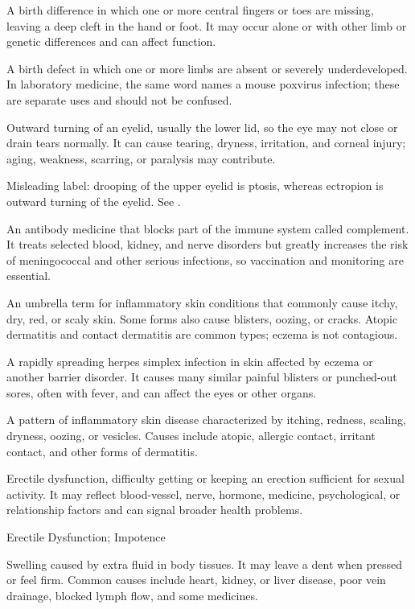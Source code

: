  A birth difference in which one or more central fingers or toes are missing, leaving a deep cleft in the hand or foot. It may occur alone or with other limb or genetic differences and can affect function.

 A birth defect in which one or more limbs are absent or severely underdeveloped. In laboratory medicine, the same word names a mouse poxvirus infection; these are separate uses and should not be confused.

 Outward turning of an eyelid, usually the lower lid, so the eye may not close or drain tears normally. It can cause tearing, dryness, irritation, and corneal injury; aging, weakness, scarring, or paralysis may contribute.

 Misleading label: drooping of the upper eyelid is ptosis, whereas ectropion is outward turning of the eyelid. See .

 An antibody medicine that blocks part of the immune system called complement. It treats selected blood, kidney, and nerve disorders but greatly increases the risk of meningococcal and other serious infections, so vaccination and monitoring are essential.

 An umbrella term for inflammatory skin conditions that commonly cause itchy, dry, red, or scaly skin. Some forms also cause blisters, oozing, or cracks. Atopic dermatitis and contact dermatitis are common types; eczema is not contagious.

 A rapidly spreading herpes simplex infection in skin affected by eczema or another barrier disorder. It causes many similar painful blisters or punched-out sores, often with fever, and can affect the eyes or other organs.

 A pattern of inflammatory skin disease characterized by itching, redness, scaling, dryness, oozing, or vesicles. Causes include atopic, allergic contact, irritant contact, and other forms of dermatitis.

 Erectile dysfunction, difficulty getting or keeping an erection sufficient for sexual activity. It may reflect blood-vessel, nerve, hormone, medicine, psychological, or relationship factors and can signal broader health problems.

\synonyms
Erectile Dysfunction; Impotence

 Swelling caused by extra fluid in body tissues. It may leave a dent when pressed or feel firm. Common causes include heart, kidney, or liver disease, poor vein drainage, blocked lymph flow, and some medicines.

